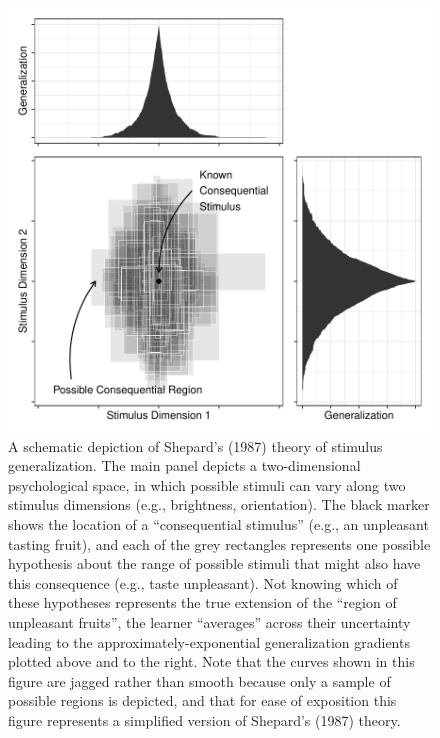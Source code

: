 \documentclass[
  english,
  doc]{apa6}
\begin{document}
\begin{figure}[p]

{\centering \includegraphics[width=4.5in]{shepardsim} 

}

\caption{A schematic depiction of Shepard's (1987) theory of stimulus generalization. The main panel depicts a two-dimensional psychological space, in which possible stimuli can vary along two stimulus dimensions (e.g., brightness, orientation). The black marker shows the location of a \enquote{consequential stimulus} (e.g., an unpleasant tasting fruit), and each of the grey rectangles represents one possible hypothesis about the range of possible stimuli that might also have this consequence (e.g., taste unpleasant). Not knowing which of these hypotheses represents the true extension of the \enquote{region of unpleasant fruits}, the learner \enquote{averages} across their uncertainty leading to the approximately-exponential generalization gradients plotted above and to the right. Note that the curves shown in this figure are jagged rather than smooth because only a sample of possible regions is depicted, and that for ease of exposition this figure represents a simplified version of Shepard's (1987) theory.}\label{fig:unnamed-chunk-1}
\end{figure}
\end{document}
